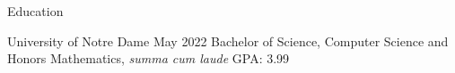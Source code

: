\documentclass{resume} %
\begin{document}

\begin{rSection}{Education}
\begin{rSubsection}{ University of Notre Dame }{ May 2022 }{}{}
Bachelor of Science, Computer Science and Honors Mathematics, {\em summa cum laude} \hfill { GPA: 3.99 $\,\!$ }
\end{rSubsection}

\end{rSection}


\newcommand\at{\textbar $\,\!$ }
\end{document}
